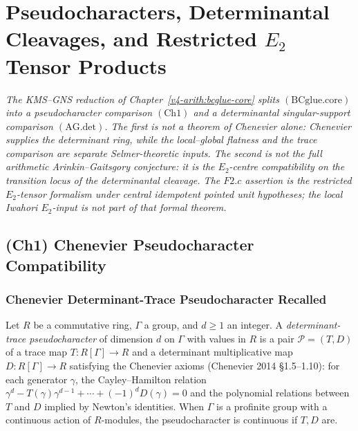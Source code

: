 \chapter{Pseudocharacters, Determinantal Cleavages, and Restricted \(E_{2}\) Tensor Products}
\label{v4-arith:w5-h:bcglue-core-and-F2c}

\emph{The KMS--GNS reduction of Chapter~\ref{v4-arith:bcglue-core}
splits \((\mathrm{BCglue.core})\) into a pseudocharacter comparison
\((\mathrm{Ch1})\) and a determinantal singular-support comparison
\((\mathrm{AG.det})\). The first is not a theorem of Chenevier alone:
Chenevier supplies the determinant ring, while the local--global
flatness and the trace comparison are separate Selmer-theoretic
inputs. The second is not the full arithmetic Arinkin--Gaitsgory
conjecture: it is the \(E_{2}\)-centre compatibility on the transition
locus of the determinantal cleavage. The \(F2.c\) assertion is the
restricted \(E_{2}\)-tensor formalism under central idempotent pointed
unit hypotheses; the local Iwahori \(E_{2}\)-input is not part of that
formal theorem.}

\section{(Ch1) Chenevier Pseudocharacter Compatibility}
\label{v4-arith:w5-h:ch1}

\subsection{Chenevier Determinant-Trace Pseudocharacter Recalled}

\begin{definition}
\label{v4-arith:w5-h:def:chenevier-det-trace}
Let \(R\) be a commutative ring, \(\Gamma\) a group, and \(d\geq 1\) an
integer. A \emph{determinant-trace pseudocharacter} of dimension \(d\)
on \(\Gamma\) with values in \(R\) is a pair
\(\mathcal{P}=(T,D)\) of a trace map
\(T\colon R[\Gamma]\to R\) and a determinant multiplicative map
\(D\colon R[\Gamma]\to R\) satisfying the Chenevier axioms
(Chenevier 2014 \S1.5--1.10): for each generator \(\gamma\),
the Cayley--Hamilton relation
\(\gamma^{d}-T(\gamma)\gamma^{d-1}+\cdots+(-1)^{d}D(\gamma)=0\) and
the polynomial relations between \(T\) and \(D\) implied by
Newton's identities. When \(\Gamma\) is a profinite group with a
continuous action of \(R\)-modules, the pseudocharacter is continuous
if \(T,D\) are.
\end{definition}


